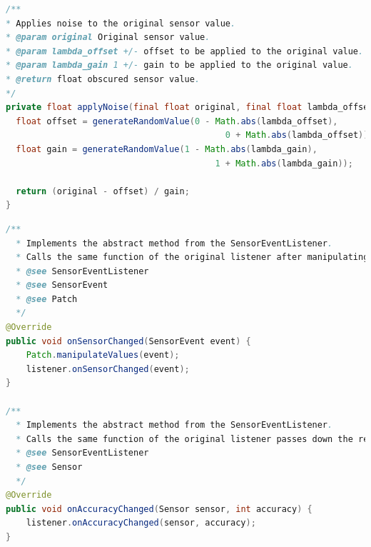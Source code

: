 \documentclass[11pt,
  oneside,openany,    %
]{scrreprt}
\begin{document}
\begin{lstlisting}[language=java, caption=Random Value Generation Function, label=lst:value_gen_func]
/**
* Applies noise to the original sensor value.
* @param original Original sensor value.
* @param lambda_offset +/- offset to be applied to the original value.
* @param lambda_gain 1 +/- gain to be applied to the original value.
* @return float obscured sensor value.
*/
private float applyNoise(final float original, final float lambda_offset, final float lambda_gain) {
  float offset = generateRandomValue(0 - Math.abs(lambda_offset), 
                                           0 + Math.abs(lambda_offset));
  float gain = generateRandomValue(1 - Math.abs(lambda_gain), 
                                         1 + Math.abs(lambda_gain));
 
  return (original - offset) / gain;
}
\end{lstlisting}
\pagebreak
\begin{lstlisting}[language=java, caption=SensorEventListener Methods, label=lst:patchlistener]
/**
  * Implements the abstract method from the SensorEventListener.
  * Calls the same function of the original listener after manipulating the received SensorEvent and passes is down.
  * @see SensorEventListener
  * @see SensorEvent
  * @see Patch
  */
@Override
public void onSensorChanged(SensorEvent event) {
    Patch.manipulateValues(event);
    listener.onSensorChanged(event);
}

/**
  * Implements the abstract method from the SensorEventListener.
  * Calls the same function of the original listener passes down the received parameters.
  * @see SensorEventListener
  * @see Sensor
  */
@Override
public void onAccuracyChanged(Sensor sensor, int accuracy) {
    listener.onAccuracyChanged(sensor, accuracy);
}
\end{lstlisting}
\pagebreak
\end{document}
